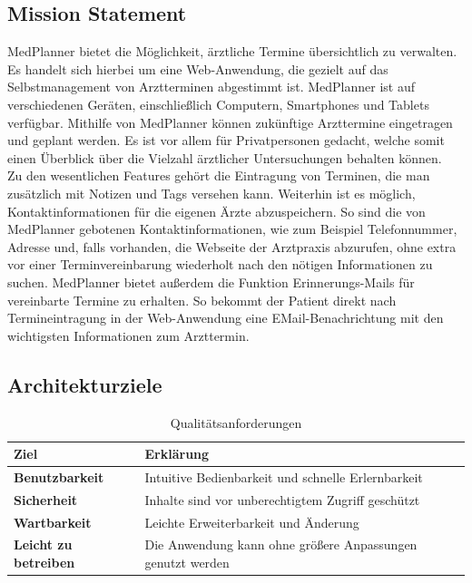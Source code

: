 \documentclass[conference]{IEEEtran}
\begin{document}
\subsection{Mission Statement}
MedPlanner bietet die Möglichkeit, ärztliche Termine übersichtlich zu verwalten. Es handelt sich hierbei um eine Web-Anwendung, die gezielt auf das Selbstmanagement von Arztterminen abgestimmt ist. MedPlanner ist auf verschiedenen Geräten, einschließlich Computern, Smartphones und Tablets verfügbar. Mithilfe von MedPlanner können zukünftige Arzttermine eingetragen und geplant werden. Es ist vor allem für Privatpersonen gedacht, welche somit einen Überblick über die Vielzahl ärztlicher Untersuchungen behalten können.\\
Zu den wesentlichen Features gehört die Eintragung von Terminen, die man zusätzlich mit Notizen und Tags versehen kann. Weiterhin ist es möglich, Kontaktinformationen für die eigenen Ärzte abzuspeichern. So sind die von MedPlanner gebotenen Kontaktinformationen, wie zum Beispiel Telefonnummer, Adresse und, falls vorhanden, die Webseite der Arztpraxis abzurufen, ohne extra vor einer Terminvereinbarung wiederholt nach den nötigen Informationen zu suchen. MedPlanner bietet außerdem die Funktion Erinnerungs-Mails für vereinbarte Termine zu erhalten. So bekommt der Patient direkt nach Termineintragung in der Web-Anwendung eine EMail-Benachrichtung mit den wichtigsten Informationen zum Arzttermin.


\subsection{Architekturziele}
\begin{table}[!h]
	\caption{Qualitätsanforderungen}
	\begin{tabularx}{\columnwidth}{>{\bfseries}l|p{57mm}}
		\toprule
		\textbf{Ziel} & Erklärung\\
		\midrule
		Benutzbarkeit & Intuitive Bedienbarkeit und schnelle Erlernbarkeit\\
		Sicherheit & Inhalte sind vor unberechtigtem Zugriff geschützt\\
		Wartbarkeit & Leichte Erweiterbarkeit und Änderung\\
		Leicht zu betreiben & Die Anwendung kann ohne größere Anpassungen genutzt werden\\
		\bottomrule
	\end{tabularx}
\end{table}
\end{document}
